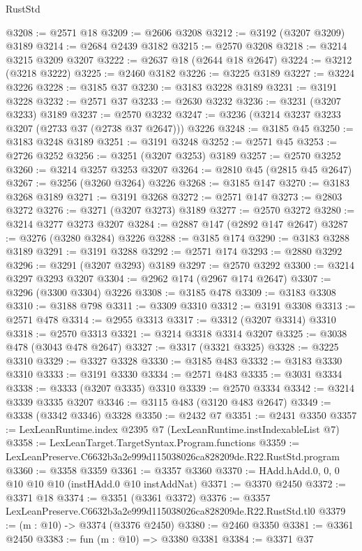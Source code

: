 \begin{lexlean}{RustStd}
\begin{coremodule}
@3208 := @2571 @18
@3209 := @2606 @3208
@3212 := @3192 (@3207 @3209) @3189
@3214 := @2684 @2439 @3182
@3215 := @2570 @3208
@3218 := @3214 @3215 @3209 @3207
@3222 := @2637 @18 (@2644 @18 @2647)
@3224 := @3212 (@3218 @3222)
@3225 := @2460 @3182
@3226 := @3225 @3189
@3227 := @3224 @3226
@3228 := @3185 @37
@3230 := @3183 @3228 @3189
@3231 := @3191 @3228
@3232 := @2571 @37
@3233 := @2630 @3232
@3236 := @3231 (@3207 @3233) @3189
@3237 := @2570 @3232
@3247 := @3236 (@3214 @3237 @3233 @3207 (@2733 @37 (@2738 @37 @2647))) @3226
@3248 := @3185 @45
@3250 := @3183 @3248 @3189
@3251 := @3191 @3248
@3252 := @2571 @45
@3253 := @2726 @3252
@3256 := @3251 (@3207 @3253) @3189
@3257 := @2570 @3252
@3260 := @3214 @3257 @3253 @3207
@3264 := @2810 @45 (@2815 @45 @2647)
@3267 := @3256 (@3260 @3264) @3226
@3268 := @3185 @147
@3270 := @3183 @3268 @3189
@3271 := @3191 @3268
@3272 := @2571 @147
@3273 := @2803 @3272
@3276 := @3271 (@3207 @3273) @3189
@3277 := @2570 @3272
@3280 := @3214 @3277 @3273 @3207
@3284 := @2887 @147 (@2892 @147 @2647)
@3287 := @3276 (@3280 @3284) @3226
@3288 := @3185 @174
@3290 := @3183 @3288 @3189
@3291 := @3191 @3288
@3292 := @2571 @174
@3293 := @2880 @3292
@3296 := @3291 (@3207 @3293) @3189
@3297 := @2570 @3292
@3300 := @3214 @3297 @3293 @3207
@3304 := @2962 @174 (@2967 @174 @2647)
@3307 := @3296 (@3300 @3304) @3226
@3308 := @3185 @478
@3309 := @3183 @3308
@3310 := @3188 @798
@3311 := @3309 @3310
@3312 := @3191 @3308
@3313 := @2571 @478
@3314 := @2955 @3313
@3317 := @3312 (@3207 @3314) @3310
@3318 := @2570 @3313
@3321 := @3214 @3318 @3314 @3207
@3325 := @3038 @478 (@3043 @478 @2647)
@3327 := @3317 (@3321 @3325)
@3328 := @3225 @3310
@3329 := @3327 @3328
@3330 := @3185 @483
@3332 := @3183 @3330 @3310
@3333 := @3191 @3330
@3334 := @2571 @483
@3335 := @3031 @3334
@3338 := @3333 (@3207 @3335) @3310
@3339 := @2570 @3334
@3342 := @3214 @3339 @3335 @3207
@3346 := @3115 @483 (@3120 @483 @2647)
@3349 := @3338 (@3342 @3346) @3328
@3350 := @2432 @7
@3351 := @2431 @3350
@3357 := LexLeanRuntime.index @2395 @7 (LexLeanRuntime.instIndexableList @7)
@3358 := LexLeanTarget.TargetSyntax.Program.functions
@3359 := LexLeanPreserve.C6632b3a2e999d115038026ca828209de.R22.RustStd.program
@3360 := @3358 @3359
@3361 := @3357 @3360
@3370 := HAdd.hAdd.{0, 0, 0} @10 @10 @10 (instHAdd.{0} @10 instAddNat)
@3371 := @3370 @2450
@3372 := @3371 @18
@3374 := @3351 (@3361 @3372)
@3376 := @3357 LexLeanPreserve.C6632b3a2e999d115038026ca828209de.R22.RustStd.tl0
@3379 := (m : @10) -> @3374 (@3376 @2450)
@3380 := @2460 @3350
@3381 := @3361 @2450
@3383 := fun (m : @10) => @3380 @3381
@3384 := @3371 @37

\end{coremodule}
\end{lexlean}
